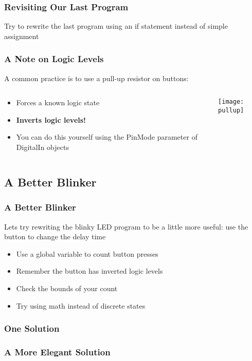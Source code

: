 \begin{frame}[fragile]
	\frametitle{Revisiting Our Last Program}
	Try to rewrite the last program using an if statement instead of simple assignment
	\pause
	
\end{frame}

\begin{frame}
	\frametitle{A Note on Logic Levels}
	A common practice is to use a pull-up resistor on buttons:
	\begin{columns}[c]
		\begin{column}{0.5\textwidth}
			\begin{itemize}
				\item Forces a known logic state
				\item \textbf{Inverts logic levels!}
				\item You can do this yourself using the PinMode parameter of DigitalIn objects
			\end{itemize}
		\end{column}
		\begin{column}{0.5\textwidth}
			\begin{center}
				\texttt{[image: pullup]}\\
			\end{center}
		\end{column}
	\end{columns}
\end{frame}

\subsection{A Better Blinker}
\label{sub:better_blink}
\begin{frame}
	\frametitle{A Better Blinker}
	Lets try rewriting the blinky LED program to be a little more useful: use the button to change the delay time
	\pause
	\begin{itemize}
		\item Use a global variable to count button presses
		\item Remember the button has inverted logic levels
		\item Check the bounds of your count
		\item Try using math instead of discrete states
	\end{itemize}
\end{frame}

\begin{frame}[fragile]
	\frametitle{One Solution}
	
\end{frame}

\begin{frame}[fragile]
	\frametitle{A More Elegant Solution}
	
\end{frame}